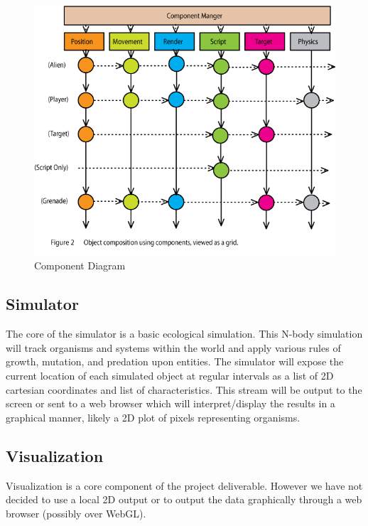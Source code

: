 \begin{figure}[h]
\includegraphics[width=\textwidth]{Fig-2.png}
\caption{Component Diagram}
\label{fig:comp}
\end{figure}

\subsection*{Simulator}
The core of the simulator is a basic ecological simulation. This N-body simulation will track organisms and systems within the world and apply various rules of growth, mutation, and predation upon entities. The simulator will expose the current location of each simulated object at regular intervals as a list of 2D cartesian coordinates and list of characteristics. This stream will be output to the screen or sent to a web browser which will interpret/display the results in a graphical manner, likely a 2D plot of pixels representing organisms.

\subsection*{Visualization}
Visualization is a core component of the project deliverable. However we have not decided to use a local 2D output or to output the data graphically through a web browser (possibly over WebGL).